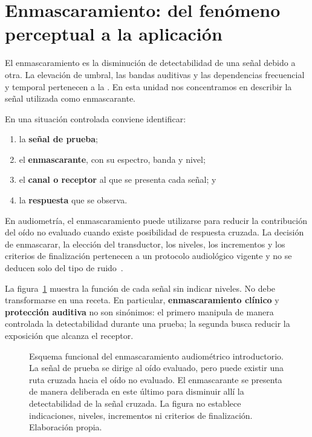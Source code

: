 \section{Enmascaramiento: del fenómeno perceptual a la aplicación}
\label{sec:u10-enmascaramiento-aplicado}

El enmascaramiento es la disminución de detectabilidad de una señal debido a
otra. La elevación de umbral, las bandas auditivas y las dependencias
frecuencial y temporal pertenecen a la . En esta
unidad nos concentramos en describir la señal utilizada como enmascarante.

En una situación controlada conviene identificar:
\begin{enumerate}
    \item la \textbf{señal de prueba};
    \item el \textbf{enmascarante}, con su espectro, banda y nivel;
    \item el \textbf{canal o receptor} al que se presenta cada señal; y
    \item la \textbf{respuesta} que se observa.
\end{enumerate}

En audiometría, el enmascaramiento puede utilizarse para reducir la
contribución del oído no evaluado cuando existe posibilidad de respuesta
cruzada. La decisión de enmascarar, la elección del transductor, los niveles,
los incrementos y los criterios de finalización pertenecen a un protocolo
audiológico vigente y no se deducen solo del tipo de ruido~\cite{ashaPureTone2005}.

La figura~\ref{fig:u10-enmascaramiento-audiometrico} muestra la función de cada
señal sin indicar niveles. No debe transformarse en una receta. En particular,
\textbf{enmascaramiento clínico} y \textbf{protección auditiva} no son
sinónimos: el primero manipula de manera controlada la detectabilidad durante
una prueba; la segunda busca reducir la exposición que alcanza el receptor.

\begin{figure}[htbp]
    \centering
    
    \caption{Esquema funcional del enmascaramiento audiométrico introductorio.
    La señal de prueba se dirige al oído evaluado, pero puede existir una ruta
    cruzada hacia el oído no evaluado. El enmascarante se presenta de manera
    deliberada en este último para disminuir allí la detectabilidad de la
    señal cruzada. La figura no establece indicaciones, niveles, incrementos
    ni criterios de finalización. Elaboración propia.}
    \label{fig:u10-enmascaramiento-audiometrico}
\end{figure}

